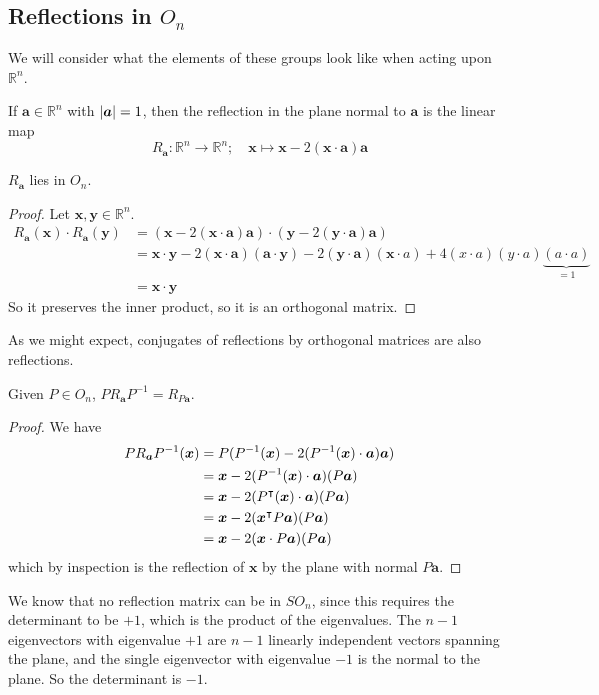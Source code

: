 \documentclass{article}
\begin{document}
\subsection{Reflections in $O_n$}
We will consider what the elements of these groups look like when acting upon $\mathbb R^n$.
\begin{definition}
	If $\bm a \in \mathbb R^n$ with $\abs{\bm a} = 1$, then the reflection in the plane normal to $\bm a$ is the linear map
	\[ R_{\bm a} \colon \mathbb R^n \to \mathbb R^n;\quad \bm x \mapsto \bm x - 2 (\bm x \cdot \bm a) \bm a \]
\end{definition}
\begin{lemma}
	$R_{\bm a}$ lies in $O_n$.
\end{lemma}
\begin{proof}
	Let $\bm x, \bm y \in \mathbb R^n$.
	\begin{align*}
		R_{\bm a}(\bm x) \cdot R_{\bm a}(\bm y) & = (\bm x - 2 (\bm x \cdot \bm a) \bm a) \cdot (\bm y - 2 (\bm y \cdot \bm a) \bm a)                                                                      \\
		                                        & = \bm x \cdot \bm y - 2(\bm x \cdot \bm a)(\bm a \cdot \bm y) - 2(\bm y\cdot \bm a)(\bm x \cdot a) + 4(x\cdot a)(y \cdot a)\underbrace{(a \cdot a)}_{=1} \\
		                                        & = \bm x \cdot \bm y
	\end{align*}
	So it preserves the inner product, so it is an orthogonal matrix.
\end{proof}
As we might expect, conjugates of reflections by orthogonal matrices are also reflections.
\begin{lemma}
	Given $P \in O_n$, $PR_{\bm a}P^{-1} = R_{P\bm a}$.
\end{lemma}
\begin{proof}
	We have
	\begin{align*}
		PR_{\bm a}P^{-1}(\bm x) & = P(P^{-1}(\bm x) - 2 (P^{-1}(\bm x) \cdot \bm a) \bm a) \\
		                        & = \bm x - 2(P^{-1}(\bm x)\cdot\bm a)(P\bm a)             \\
		                        & = \bm x - 2(P^\intercal (\bm x)\cdot\bm a)(P\bm a)      \\
		                        & = \bm x - 2(\bm x^\intercal P \bm a)(P\bm a)            \\
		                        & = \bm x - 2(\bm x \cdot P\bm a)(P\bm a)
	\end{align*}
	which by inspection is the reflection of $\bm x$ by the plane with normal $P\bm a$.
\end{proof}
We know that no reflection matrix can be in $SO_n$, since this requires the determinant to be $+1$, which is the product of the eigenvalues. The $n-1$ eigenvectors with eigenvalue $+1$ are $n-1$ linearly independent vectors spanning the plane, and the single eigenvector with eigenvalue $-1$ is the normal to the plane. So the determinant is $-1$.
\end{document}
